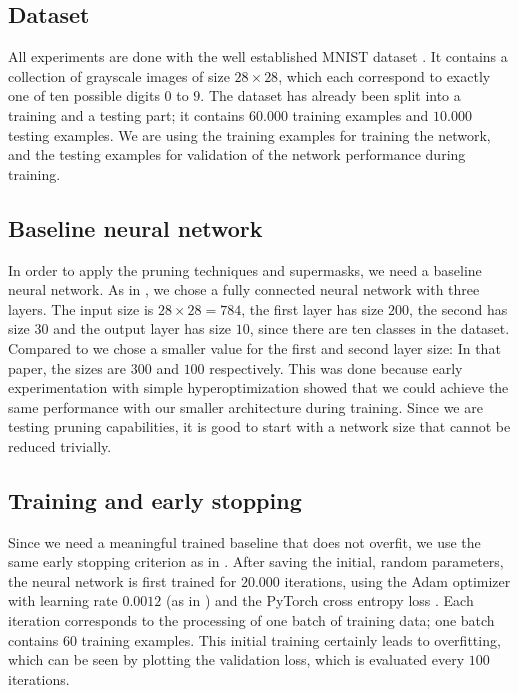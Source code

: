 \documentclass[12pt,final,twoside]{article}
\theoremstyle{plain}
\theoremstyle{definition}
\theoremstyle{remark}
\theoremstyle{named}
\begin{document}
\subsection{Dataset}

All experiments are done with the well established MNIST dataset \cite{mnist}. It contains a collection of grayscale images of size $28 \times 28$, which each correspond to exactly one of ten possible digits $0$ to $9$. The dataset has already been split into a training and a testing part; it contains $60.000$ training examples and $10.000$ testing examples. We are using the training examples for training the network, and the testing examples for validation of the network performance during training.

\subsection{Baseline neural network}

In order to apply the pruning techniques and supermasks, we need a baseline neural network. As in \cite{supermask}, we chose a fully connected neural network with three layers. The input size is $28 \times 28 = 784$, the first layer has size $200$, the second has size $30$ and the output layer has size $10$, since there are ten classes in the dataset. Compared to \cite{supermask} we chose a smaller value for the first and second layer size: In that paper, the sizes are $300$ and $100$ respectively. This was done because early experimentation with simple hyperoptimization showed that we could achieve the same performance with our smaller architecture during training. Since we are testing pruning capabilities, it is good to start with a network size that cannot be reduced trivially.


\subsection{Training and early stopping}

Since we need a meaningful trained baseline that does not overfit, we use the same early stopping criterion as in \cite{supermask}. After saving the initial, random parameters, the neural network is first trained for $20.000$ iterations, using the Adam optimizer \cite{adam} with learning rate $0.0012$ (as in \cite{supermask}) and the PyTorch cross entropy loss \cite{pytorch}. Each iteration corresponds to the processing of one batch of training data; one batch contains $60$ training examples. This initial training certainly leads to overfitting, which can be seen by plotting the validation loss, which is evaluated every $100$ iterations.
\end{document}
